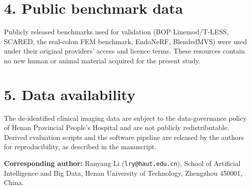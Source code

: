 \documentclass[11pt]{article}
\begin{document}
\section*{4. Public benchmark data}
Publicly released benchmarks used for validation (BOP Linemod/T-LESS, SCARED,
the real-colon FEM benchmark, EndoNeRF, BlendedMVS) were used under their
original providers' access and licence terms. These resources contain no new
human or animal material acquired for the present study.

\section*{5. Data availability}
The de-identified clinical imaging data are subject to the data-governance
policy of Henan Provincial People's Hospital and are not publicly
redistributable. Derived evaluation scripts and the software pipeline are
released by the authors for reproducibility, as described in the manuscript.

\vspace{1.2em}
\noindent\textbf{Corresponding author:} Ranyang Li (\texttt{lry@haut.edu.cn}),
School of Artificial Intelligence and Big Data, Henan University of Technology,
Zhengzhou 450001, China.
\end{document}

